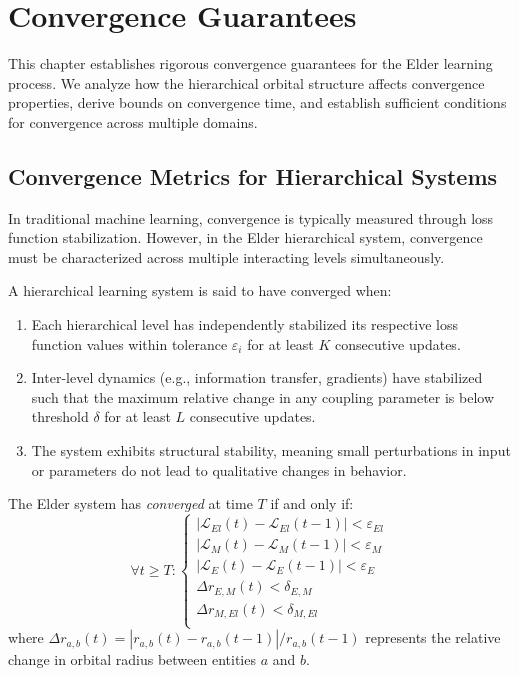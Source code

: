 \chapter{Convergence Guarantees}

This chapter establishes rigorous convergence guarantees for the Elder learning process. We analyze how the hierarchical orbital structure affects convergence properties, derive bounds on convergence time, and establish sufficient conditions for convergence across multiple domains.

\section{Convergence Metrics for Hierarchical Systems}



In traditional machine learning, convergence is typically measured through loss function stabilization. However, in the Elder hierarchical system, convergence must be characterized across multiple interacting levels simultaneously.

\begin{definition}
A hierarchical learning system is said to have converged when:
\begin{enumerate}
    \item Each hierarchical level has independently stabilized its respective loss function values within tolerance $\varepsilon_i$ for at least $K$ consecutive updates.
    \item Inter-level dynamics (e.g., information transfer, gradients) have stabilized such that the maximum relative change in any coupling parameter is below threshold $\delta$ for at least $L$ consecutive updates.
    \item The system exhibits structural stability, meaning small perturbations in input or parameters do not lead to qualitative changes in behavior.
\end{enumerate}
\end{definition}

\begin{definition}
The Elder system has \emph{converged} at time $T$ if and only if:
\begin{equation}
\forall t \geq T: \left\{
\begin{array}{l}
|\mathcal{L}_{El}(t) - \mathcal{L}_{El}(t-1)| < \varepsilon_{El} \\
|\mathcal{L}_{M}(t) - \mathcal{L}_{M}(t-1)| < \varepsilon_{M} \\
|\mathcal{L}_{E}(t) - \mathcal{L}_{E}(t-1)| < \varepsilon_{E} \\
\Delta r_{E,M}(t) < \delta_{E,M} \\
\Delta r_{M,El}(t) < \delta_{M,El} \\
\end{array}
\right.
\end{equation}
where $\Delta r_{a,b}(t) = |r_{a,b}(t) - r_{a,b}(t-1)|/r_{a,b}(t-1)$ represents the relative change in orbital radius between entities $a$ and $b$.
\end{definition}

